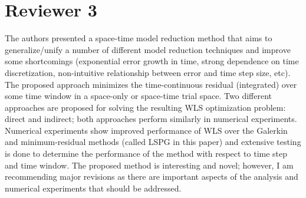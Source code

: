 \documentclass[3p,computermodern,10pt]{elsarticle}
\begin{document}
\section{Reviewer 3}
The authors presented a space-time model reduction method that aims to generalize/unify a number of different model reduction techniques and improve some shortcomings (exponential error growth in time, strong dependence on time discretization, non-intuitive relationship between error and time step size, etc). The proposed approach minimizes the time-continuous residual (integrated) over some time window in a space-only or space-time trial space. Two different approaches are proposed for solving the resulting WLS optimization problem: direct and indirect; both approaches perform similarly in numerical experiments. Numerical experiments show improved performance of WLS over the Galerkin and minimum-residual methods (called LSPG in this paper) and extensive testing is done to determine the performance of the method with respect to time step and time window. The proposed method is interesting and novel; however, I am recommending major revisions as there are
important aspects of the analysis and numerical experiments that should be addressed.
\end{document}
